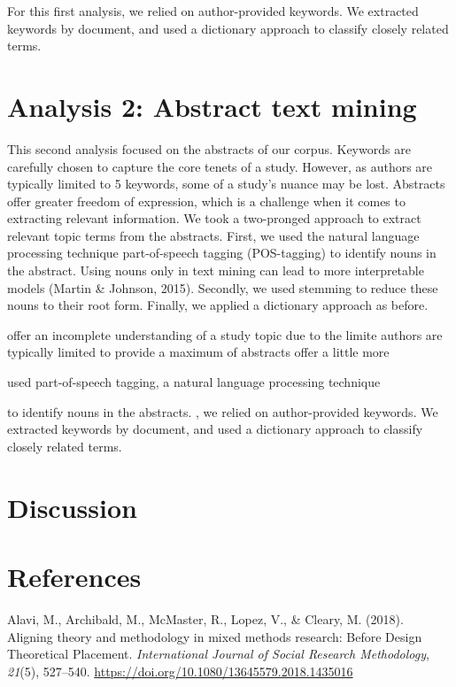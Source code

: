 \documentclass[
  english,
  man]{apa6}
\begin{document}
For this first analysis, we relied on author-provided keywords.
We extracted keywords by document, and used a dictionary approach
to classify closely related terms.

\hypertarget{analysis-2-abstract-text-mining}{%
\section{Analysis 2: Abstract text mining}\label{analysis-2-abstract-text-mining}}

This second analysis focused on the abstracts of our corpus. Keywords are
carefully chosen to capture the core tenets of a study. However, as authors are
typically limited to 5 keywords, some of a study's nuance may be lost.
Abstracts offer greater freedom of expression, which is a challenge when it
comes to extracting relevant information. We took a two-pronged approach to
extract relevant topic terms from the abstracts. First, we used the natural
language processing technique part-of-speech tagging (POS-tagging) to identify
nouns in the abstract. Using nouns only in text mining can lead to more
interpretable models (Martin \& Johnson, 2015). Secondly, we used
stemming to reduce these nouns to their root form. Finally, we applied a
dictionary approach as before.

offer an incomplete understanding of a study topic due to the limite
authors are typically limited to provide a maximum of
abstracts offer a little more

used part-of-speech tagging, a natural language processing technique

to identify nouns in the abstracts.
, we relied on author-provided keywords. We extracted keywords by document, and used a dictionary approach to classify closely related terms.

\hypertarget{discussion}{%
\section{Discussion}\label{discussion}}

\newpage

\hypertarget{references}{%
\section{References}\label{references}}

\begingroup
\setlength{\parindent}{-0.5in}
\setlength{\leftskip}{0.5in}

\hypertarget{refs}{}
\leavevmode\hypertarget{ref-alaviAligningTheoryMethodology2018}{}%
Alavi, M., Archibald, M., McMaster, R., Lopez, V., \& Cleary, M. (2018). Aligning theory and methodology in mixed methods research: Before Design Theoretical Placement. \emph{International Journal of Social Research Methodology}, \emph{21}(5), 527--540. \url{https://doi.org/10.1080/13645579.2018.1435016}
\end{document}
